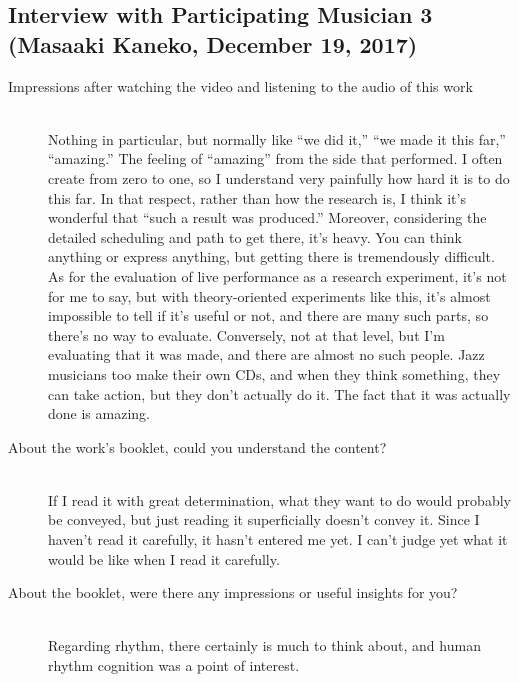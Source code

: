 \subsection{Interview with Participating Musician 3 (Masaaki Kaneko, December 19, 2017)}

\begin{description}
\item[Impressions after watching the video and listening to the audio of this work]\mbox{}\\

Nothing in particular, but normally like ``we did it,'' ``we made it this far,'' ``amazing.'' The feeling of ``amazing'' from the side that performed. I often create from zero to one, so I understand very painfully how hard it is to do this far. In that respect, rather than how the research is, I think it's wonderful that ``such a result was produced.'' Moreover, considering the detailed scheduling and path to get there, it's heavy. You can think anything or express anything, but getting there is tremendously difficult. As for the evaluation of live performance as a research experiment, it's not for me to say, but with theory-oriented experiments like this, it's almost impossible to tell if it's useful or not, and there are many such parts, so there's no way to evaluate. Conversely, not at that level, but I'm evaluating that it was made, and there are almost no such people. Jazz musicians too make their own CDs, and when they think something, they can take action, but they don't actually do it. The fact that it was actually done is amazing.\\

\item [About the work's booklet, could you understand the content?]\mbox{}\\

If I read it with great determination, what they want to do would probably be conveyed, but just reading it superficially doesn't convey it. Since I haven't read it carefully, it hasn't entered me yet. I can't judge yet what it would be like when I read it carefully.\\

\item [About the booklet, were there any impressions or useful insights for you?]\mbox{}\\

Regarding rhythm, there certainly is much to think about, and human rhythm cognition was a point of interest.\\


\end{description}
